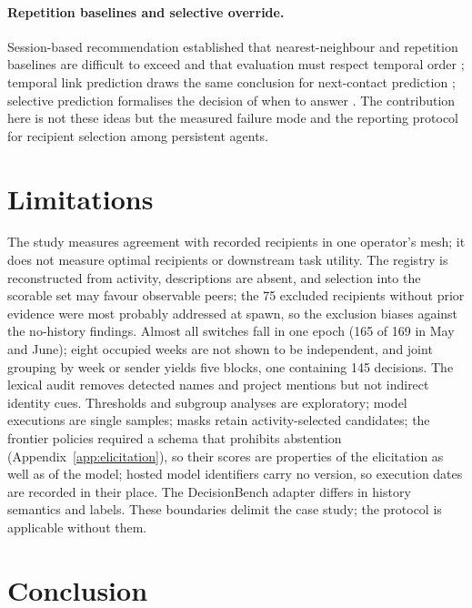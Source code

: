 \documentclass[11pt]{article}
\theoremstyle{definition}
\begin{document}
\paragraph{Repetition baselines and selective override.}
Session-based recommendation established that nearest-neighbour and repetition baselines are difficult to exceed and that evaluation must respect temporal order \citep{sessionrec2018}; temporal link prediction draws the same conclusion for next-contact prediction \citep{templinkpred2020}; selective prediction formalises the decision of when to answer \citep{selectivepred2017}. The contribution here is not these ideas but the measured failure mode and the reporting protocol for recipient selection among persistent agents.

\section{Limitations}

The study measures agreement with recorded recipients in one operator's mesh; it does not measure optimal recipients or downstream task utility. The registry is reconstructed from activity, descriptions are absent, and selection into the scorable set may favour observable peers; the 75 excluded recipients without prior evidence were most probably addressed at spawn, so the exclusion biases against the no-history findings. Almost all switches fall in one epoch (165 of 169 in May and June); eight occupied weeks are not shown to be independent, and joint grouping by week or sender yields five blocks, one containing 145 decisions. The lexical audit removes detected names and project mentions but not indirect identity cues. Thresholds and subgroup analyses are exploratory; model executions are single samples; masks retain activity-selected candidates; the frontier policies required a schema that prohibits abstention (Appendix~\ref{app:elicitation}), so their scores are properties of the elicitation as well as of the model; hosted model identifiers carry no version, so execution dates are recorded in their place. The DecisionBench adapter differs in history semantics and labels. These boundaries delimit the case study; the protocol is applicable without them.

\section{Conclusion}
\end{document}
